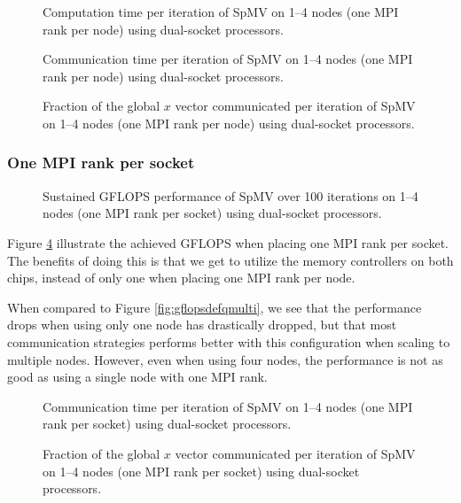 \begin{figure}[H]
    \centering
    \caption{Computation time per iteration of SpMV on 1–4 nodes (one MPI rank per node) using dual-socket  processors.}
    \label{fig:tcompdefqmulti}
\end{figure}

\begin{figure}[H]
    \centering
    \caption{Communication time per iteration of SpMV on 1–4 nodes (one MPI rank per node) using dual-socket  processors.}
    \label{fig:tcommdefqmulti}
\end{figure}


\begin{figure}[H]
    \centering
    \caption{Fraction of the global \(x\) vector communicated per iteration of SpMV on 1–4 nodes (one MPI rank per node) using dual-socket  processors.}
    \label{fig:commloaddefqmulti}
\end{figure}

\subsubsection{One MPI rank per socket}


\begin{figure}[H]
    \centering
    \caption{Sustained GFLOPS performance of SpMV over 100 iterations on 1–4 nodes (one MPI rank per socket) using dual-socket  processors.}
    \label{fig:gflopsdefqmpimulti}
\end{figure}


Figure \ref{fig:gflopsdefqmpimulti} illustrate the achieved GFLOPS when placing one MPI rank per socket. The benefits of doing this is that we get to utilize the memory controllers on both chips, instead of only one when placing one MPI rank per node.
\medskip

When compared to Figure \ref{fig:gflopsdefqmulti}, we see that the performance drops when using only one node has drastically dropped, but that most communication strategies performs better with this configuration when scaling to multiple nodes. However, even when using four nodes, the performance is not as good as using a single node with one MPI rank.

\begin{figure}[H]
    \centering
    \caption{Communication time per iteration of SpMV on 1–4 nodes (one MPI rank per socket) using dual-socket  processors.}
    \label{fig:tcommdefqmpimulti}
\end{figure}


\begin{figure}[H]
    \centering
    \caption{Fraction of the global \(x\) vector communicated per iteration of SpMV on 1–4 nodes (one MPI rank per socket) using dual-socket  processors.}
    \label{fig:commloaddefqmpimulti}
\end{figure}
